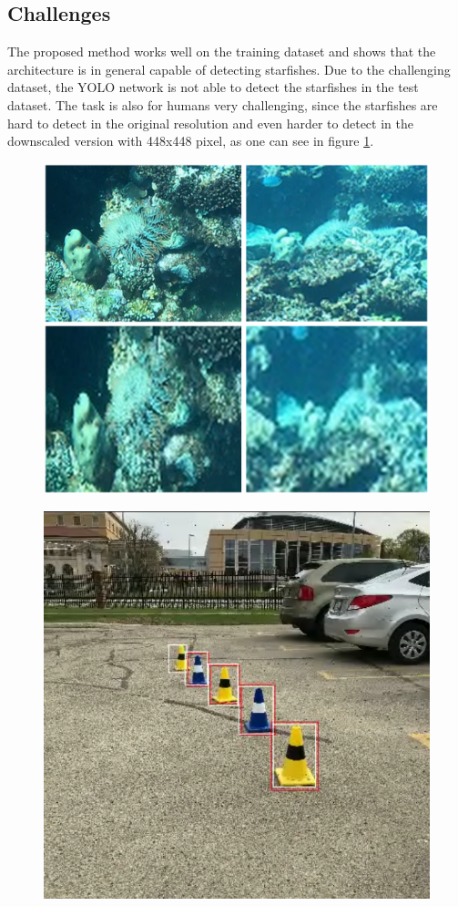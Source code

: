 \documentclass[landscape,a2,final,12pt]{issposter}
\begin{document}
\begin{multicols}{3}
\begin{samepage}
    \section{Challenges}
        \begin{small}The proposed method works well on the training dataset and shows that the architecture is in general 
            capable of detecting starfishes. Due to the challenging dataset, the YOLO network is not able to detect the 
            starfishes in the test dataset. 
            The task is also for humans very challenging, since the starfishes are hard to detect in the original resolution 
            and even harder to detect in the downscaled version with 448x448 pixel, as one can see in figure \ref{fig:img_qual}. 
                \begin{figure}
                    \begin{minipage}[b]{.5\textwidth}
                        \begin{center}
                        \includegraphics[width=.6\linewidth]{6_img_quality.png}
                        \captionsetup{justification=centering}
                        \label{fig:img_qual}
                        \end{center}
                    \end{minipage}%
                    \begin{minipage}[b]{.4\textwidth}
                        \begin{center}
                        \includegraphics[width=.65\linewidth]{6_traffic_cones.png}

\end{center}
\end{minipage}
\end{figure}
\end{small}
\end{samepage}
\end{multicols}
\end{document}
